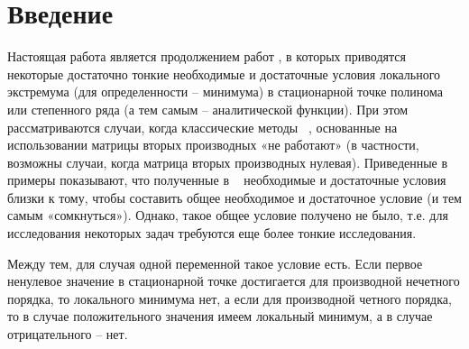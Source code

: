 
\doi{}		 %



\section*{Введение}  %
Настоящая работа является продолжением работ \cite{nef:1, nef:2, nef:3}, в которых приводятся некоторые достаточно тонкие необходимые и достаточные условия локального экстремума (для определенности – минимума) в стационарной точке полинома или степенного ряда (а тем самым – аналитической функции). При этом рассматриваются случаи, когда классические методы ~\cite{nef:4}, основанные на использовании матрицы вторых производных «не работают» (в частности, возможны случаи, когда матрица вторых производных нулевая). Приведенные в ~\cite{nef:3} примеры показывают, что полученные в ~\cite{nef:1, nef:2, nef:3} необходимые и достаточные условия близки к тому, чтобы составить общее необходимое и достаточное условие (и тем самым «сомкнуться»). Однако, такое общее условие получено не было, т.е. для исследования некоторых задач требуются еще более тонкие исследования.

Между тем, для случая одной переменной такое условие есть. Если первое ненулевое значение в стационарной точке достигается для производной нечетного порядка, то локального минимума нет, а если для производной четного порядка, то в случае положительного значения имеем локальный минимум, а в случае отрицательного – нет.

